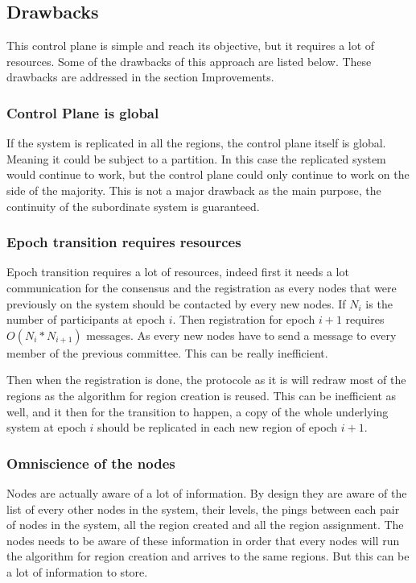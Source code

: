 \documentclass[a4paper,11pt,oneside]{report}
\begin{document}
\subsection{Drawbacks}
This control plane is simple and reach its objective, but it requires a lot of
resources. Some of the drawbacks of this approach are listed below. 
These drawbacks are addressed in the section Improvements.  

\subsubsection{Control Plane is global}
If the system is replicated in all the regions, the control plane itself is
global. Meaning it could be subject to a partition. In this case the replicated
system would continue to work, but the control plane could only continue to
work on the side of the majority. This is not a major drawback as the main
purpose, the continuity of the subordinate system is guaranteed.

\subsubsection{Epoch transition requires resources}
Epoch transition requires a lot of resources, indeed first it needs a lot
communication for the consensus and the registration as every nodes that were
previously on the system should be contacted by every new nodes. If $N_i$ is
the number of participants at epoch $i$. Then registration for epoch $i+1$
requires $O(N_i * N_{i+1})$ messages. As every new nodes have to send a message
to every member of the previous committee. This can be really inefficient. 

Then when the registration is done, the protocole as it is will redraw most of
the regions as the algorithm for region creation is reused. This can be
inefficient as well, and it then for the transition to happen, a copy of the
whole underlying system at epoch $i$ should be replicated in each new region of
epoch $i+1$.
 
\subsubsection{Omniscience of the nodes}
Nodes are actually aware of a lot of information. By design they are aware of
the list of every other nodes in the system, their levels, the pings between
each pair of nodes in the system, all the region created and all the region
assignment. The nodes needs to be aware of these information in order that
every nodes will run the algorithm for region creation and arrives to the same
regions. But this can be a lot of information to store.
\end{document}

